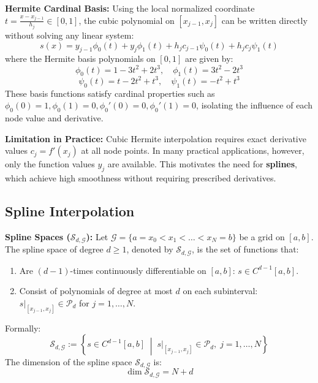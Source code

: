 \begin{definition}
    \textbf{Hermite Cardinal Basis:} Using the local normalized coordinate $t = \frac{x - x_{j-1}}{h_j} \in [0, 1]$, the cubic polynomial on $[x_{j-1}, x_j]$ can be written directly without solving any linear system:
    $$s(x) = y_{j-1} \phi_0(t) + y_j \phi_1(t) + h_j c_{j-1} \psi_0(t) + h_j c_j \psi_1(t)$$
    where the Hermite basis polynomials on $[0,1]$ are given by:
    $$\phi_0(t) = 1 - 3t^2 + 2t^3, \quad \phi_1(t) = 3t^2 - 2t^3$$
    $$\psi_0(t) = t - 2t^2 + t^3, \quad \psi_1(t) = -t^2 + t^3$$
    These basis functions satisfy cardinal properties such as $\phi_0(0)=1, \phi_0(1)=0, \phi_0'(0)=0, \phi_0'(1)=0$, isolating the influence of each node value and derivative.
\end{definition}

\begin{remark}
    \textbf{Limitation in Practice:} Cubic Hermite interpolation requires exact derivative values $c_j = f'(x_j)$ at all node points. In many practical applications, however, only the function values $y_j$ are available. This motivates the need for \textbf{splines}, which achieve high smoothness without requiring prescribed derivatives.
\end{remark}

\subsection{Spline Interpolation}

\begin{definition}
    \textbf{Spline Spaces ($\mathcal{S}_{d,\mathcal{G}}$):} Let $\mathcal{G} = \{a = x_0 < x_1 < \dots < x_N = b\}$ be a grid on $[a,b]$. The spline space of degree $d \ge 1$, denoted by $\mathcal{S}_{d,\mathcal{G}}$, is the set of functions that:
    \begin{enumerate}
        \item Are $(d-1)$-times continuously differentiable on $[a,b]$: $s \in C^{d-1}[a,b]$.
        \item Consist of polynomials of degree at most $d$ on each subinterval: $s|_{[x_{j-1}, x_j]} \in \mathcal{P}_d$ for $j = 1, \dots, N$.
    \end{enumerate}
    Formally:
    $$\mathcal{S}_{d,\mathcal{G}} := \left\{ s \in C^{d-1}[a,b] \;\middle|\; s|_{[x_{j-1}, x_j]} \in \mathcal{P}_d, \; j = 1, \dots, N \right\}$$
    The dimension of the spline space $\mathcal{S}_{d,\mathcal{G}}$ is:
    $$\dim \mathcal{S}_{d,\mathcal{G}} = N + d$$
\end{definition}

